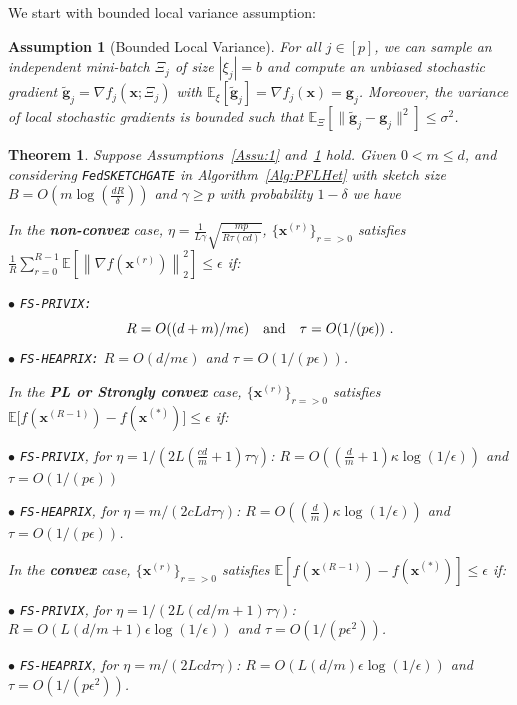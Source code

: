 \documentclass[11pt]{article}
\newtheorem{theorem}{Theorem}
\newtheorem{assumption}{Assumption}
\begin{document}
We start with bounded local variance assumption:
\begin{assumption}[Bounded Local Variance]\label{Assu:2}
For all $j\in [p]$, we can sample an independent mini-batch $\Xi_j$ of size $|{\xi}_j| = b$ and compute an unbiased stochastic gradient $\tilde{\mathbf{g}}_j = \nabla f_j(\boldsymbol{x}; \Xi_j)$ with $\mathbb{E}_{\xi}[\tilde{\mathbf{g}}_j] = \nabla f_{j}(\boldsymbol{x})={\mathbf{g}}_j$. 
Moreover, the variance of local stochastic gradients is bounded such that $
\mathbb{E}_{\Xi}\left[\|\tilde{\mathbf{g}}_j-{\mathbf{g}}_j\|^2\right]\leq \sigma^2$.
\end{assumption}
\begin{theorem}\label{thm:hetreg_case}
Suppose Assumptions~\ref{Assu:1} and~\ref{Assu:2} hold. Given $0<m\leq d$, and considering \texttt{FedSKETCHGATE} in Algorithm~\ref{Alg:PFLHet} with sketch size $B=O\left(m\log\left(\frac{d R}{\delta}\right)\right)$ and $\gamma\geq p$ with probability $1-\delta$ we have  



In the \textbf{non-convex} case, $\eta=\frac{1}{L\gamma}\sqrt{\frac{mp}{R\tau\left(cd\right)}}$, $\{ {\boldsymbol{x}}^{(r)}\}_{r=>0}$ satisfies  $\frac{1}{R}\sum_{r=0}^{R-1}\mathbb{E}\left[\left\|\nabla f({\boldsymbol{x}}^{(r)})\right\|_2^2\right]\leq {\epsilon}$ if: 
 
\noindent $\bullet$ \texttt{FS-PRIVIX:}    
\begin{equation}\notag
R=O((d+m)/m\epsilon) \quad \textrm{and} \quad \tau=O(1/(p\epsilon))\ .
 \end{equation}
\noindent $\bullet$ \texttt{FS-HEAPRIX:} $R=O(d/m\epsilon)$ and $\tau=O(1/(p\epsilon))$.

In the \textbf{PL or Strongly convex} case, $\{ {\boldsymbol{x}}^{(r)}\}_{r=>0}$ satisfies $\mathbb{E}\Big[f({\boldsymbol{x}}^{(R-1)})-f({\boldsymbol{x}}^{(*)})\Big]\leq \epsilon$ if: 

\noindent $\bullet$ \texttt{FS-PRIVIX}, for $\eta=1/(2L(\frac{cd}{m}+1)\tau\gamma)$: $R=O\left((\frac{d}{m}+1)\kappa \log(1/\epsilon)\right)$ and $\tau=O\left(1/(p\epsilon)\right)$

\noindent $\bullet$ \texttt{FS-HEAPRIX}, for $\eta=m/(2cLd\tau\gamma)$: $R=O\left((\frac{d}{m})\kappa \log(1/\epsilon)\right)$ and $\tau=O\left(1/(p\epsilon)\right)$.

 In the \textbf{convex} case, $\{ {\boldsymbol{x}}^{(r)}\}_{r=>0}$ satisfies $ \mathbb{E}[f({\boldsymbol{x}}^{(R-1)})-f({\boldsymbol{x}}^{(*)})]\leq \epsilon$ if: 
 
\noindent $\bullet$ \texttt{FS-PRIVIX}, for $\eta=1/(2L(c d/m+1)\tau\gamma)$:  $R=O\left(L(d/m+1)\epsilon \log(1/\epsilon)\right)$ and $\tau=O\left(1/(p\epsilon^2)\right)$.

\noindent $\bullet$ \texttt{FS-HEAPRIX}, for $\eta=m/(2L c d\tau\gamma)$: $R=O\left(L(d/m)\epsilon \log(1/\epsilon)\right)$ and $\tau=O\left(1/(p\epsilon^2)\right)$.
 \end{theorem}
\end{document}
